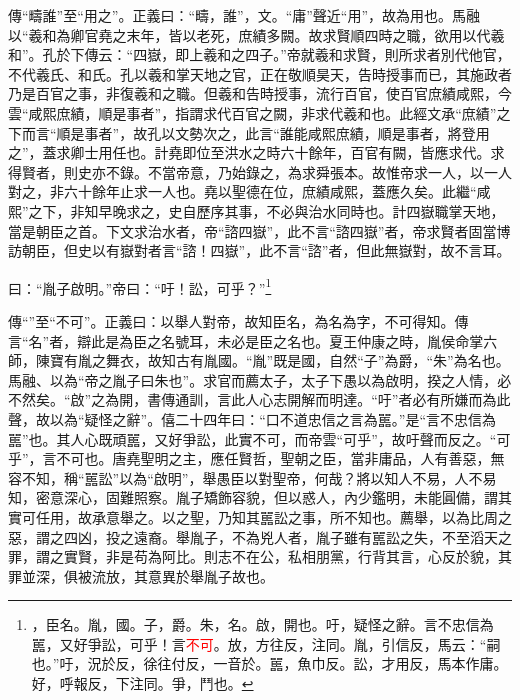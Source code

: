 {\noindent\zhuan{}\fzbyks 傳“疇誰”至“用之”。正義曰：“疇，誰”，文。“庸”聲近“用”，故為用也。馬融以“羲和為卿官堯之末年，皆以老死，庶績多闕。故求賢順四時之職，欲用以代羲和”。孔於下傳云：“四嶽，即上羲和之四子。”帝就羲和求賢，則所求者別代他官，不代羲氏、和氏。孔以羲和掌天地之官，正在敬順昊天，告時授事而已，其施政者乃是百官之事，非復羲和之職。但羲和告時授事，流行百官，使百官庶績咸熙，今雲“咸熙庶績，順是事者”，指謂求代百官之闕，非求代羲和也。此經文承“庶績”之下而言“順是事者”，故孔以文勢次之，此言“誰能咸熙庶績，順是事者，將登用之”，蓋求卿士用任也。計堯即位至洪水之時六十餘年，百官有闕，皆應求代。求得賢者，則史亦不錄。不當帝意，乃始錄之，為求舜張本。故惟帝求一人，以一人對之，非六十餘年止求一人也。堯以聖德在位，庶績咸熙，蓋應久矣。此繼“咸熙”之下，非知早晚求之，史自歷序其事，不必與治水同時也。計四嶽職掌天地，當是朝臣之首。下文求治水者，帝“諮四嶽”，此不言“諮四嶽”者，帝求賢者固當博訪朝臣，但史以有嶽對者言“諮！四嶽”，此不言“諮”者，但此無嶽對，故不言耳。 \par}

曰：“胤子啟明。”帝曰：“吁！訟，可乎？”\footnote{\textcolor{red}{}，臣名。胤，國。子，爵。朱，名。啟，開也。吁，疑怪之辭。言不忠信為嚚，又好爭訟，可乎！言\textcolor{red}{不可}。放，方往反，注同。胤，引信反，馬云：“嗣也。”吁，況於反，徐往付反，一音於。嚚，魚巾反。訟，才用反，馬本作庸。好，呼報反，下注同。爭，鬥也。}

{\noindent\zhuan{}\fzbyks 傳“”至“不可”。正義曰：以舉人對帝，故知臣名，為名為字，不可得知。傳言“名”者，辯此是為臣之名號耳，未必是臣之名也。夏王仲康之時，胤侯命掌六師，陳寶有胤之舞衣，故知古有胤國。“胤”既是國，自然“子”為爵，“朱”為名也。馬融、以為“帝之胤子曰朱也”。求官而薦太子，太子下愚以為啟明，揆之人情，必不然矣。“啟”之為開，書傳通訓，言此人心志開解而明達。“吁”者必有所嫌而為此聲，故以為“疑怪之辭”。僖二十四年曰：“口不道忠信之言為嚚。”是“言不忠信為嚚”也。其人心既頑嚚，又好爭訟，此實不可，而帝雲“可乎”，故吁聲而反之。“可乎”，言不可也。唐堯聖明之主，應任賢哲，聖朝之臣，當非庸品，人有善惡，無容不知，稱“嚚訟”以為“啟明”，舉愚臣以對聖帝，何哉？將以知人不易，人不易知，密意深心，固難照察。胤子矯飾容貌，但以惑人，內少鑑明，未能圓備，謂其實可任用，故承意舉之。以之聖，乃知其嚚訟之事，所不知也。薦舉，以為比周之惡，謂之四凶，投之遠裔。舉胤子，不為兇人者，胤子雖有嚚訟之失，不至滔天之罪，謂之實賢，非是苟為阿比。則志不在公，私相朋黨，行背其言，心反於貌，其罪並深，俱被流放，其意異於舉胤子故也。 \par}

